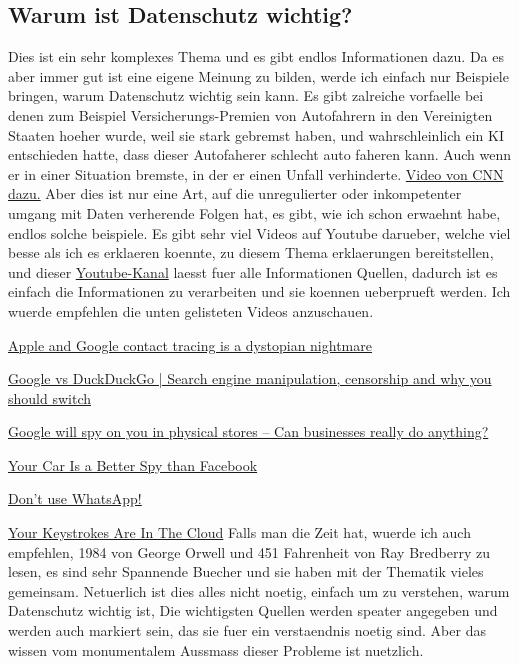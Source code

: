 \documentclass{report}
\begin{document}
\subsection{Warum ist Datenschutz wichtig?}
Dies ist ein sehr komplexes Thema und es gibt endlos Informationen dazu. Da es aber immer gut ist eine eigene Meinung zu bilden, werde ich einfach nur Beispiele bringen, warum Datenschutz wichtig sein kann.
\newline
Es gibt zalreiche vorfaelle bei denen zum Beispiel Versicherungs-Premien von Autofahrern in den Vereinigten Staaten hoeher wurde, weil sie stark gebremst haben, und wahrschleinlich ein KI entschieden hatte, dass dieser Autofaherer schlecht auto faheren kann. Auch wenn er in einer Situation bremste, in der er einen Unfall verhinderte.
\hyperlink{https://youtube.com/watch?v=aHhx8mMUV2o}{Video von CNN dazu.}
\newline
Aber dies ist nur eine Art, auf die unregulierter oder inkompetenter umgang mit Daten verherende Folgen hat, es gibt, wie ich schon erwaehnt habe, endlos solche beispiele.
\newline
Es gibt sehr viel Videos auf Youtube darueber, welche viel besse als ich es erklaeren koennte, zu diesem Thema erklaerungen bereitstellen, und dieser \hyperlink{https://youtube.com/channel/UCjr2bPAyPV7t35MvcgT3W8Q}{Youtube-Kanal} laesst fuer alle Informationen Quellen, dadurch ist es einfach die Informationen zu verarbeiten und sie koennen ueberprueft werden.
Ich wuerde empfehlen die unten gelisteten Videos anzuschauen.

\hyperlink{https://youtube.com/watch?v=WRalTWAFBY4}{Apple and Google contact tracing is a dystopian nightmare}

\hyperlink{https://youtube.com/watch?v=SrsCEbi5N7Y}{Google vs DuckDuckGo | Search engine manipulation, censorship and why you should switch}

\hyperlink{https://youtube.com/watch?v=vZBa5-wFAfQ}{Google will spy on you in physical stores – Can businesses really do anything?}

\hyperlink{https://youtube.com/watch?v=WX2SWUMt_fk}{Your Car Is a Better Spy than Facebook}

\hyperlink{https://youtube.com/watch?v=shpiVm1qpnw}{Don't use WhatsApp!}

\hyperlink{https://youtube.com/watch?v=vCRX0MZm2KI}{Your Keystrokes Are In The Cloud}
\newline
Falls man die Zeit hat, wuerde ich auch empfehlen, 1984 von George Orwell und 451 Fahrenheit von Ray Bredberry zu lesen, es sind sehr Spannende Buecher und sie haben mit der Thematik vieles gemeinsam.
Netuerlich ist dies alles nicht noetig, einfach um zu verstehen, warum Datenschutz wichtig ist, Die wichtigsten Quellen werden speater angegeben und werden auch markiert sein, das sie fuer ein verstaendnis noetig sind. Aber das wissen vom monumentalem Aussmass dieser Probleme ist nuetzlich. 
\end{document}
